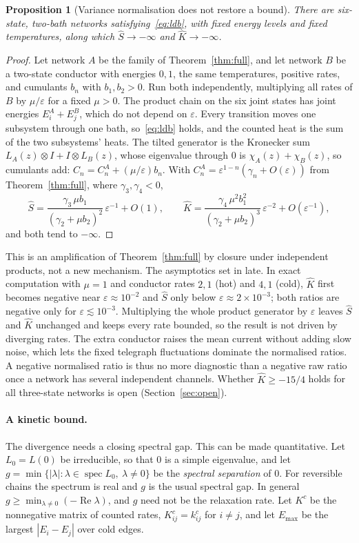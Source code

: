 \documentclass[11pt,a4paper]{article}
\newtheorem{proposition}[theorem]{Proposition}
\theoremstyle{remark}\newtheorem{remark}[theorem]{Remark}
\newcommand{\eps}{\varepsilon}
\begin{document}
\begin{proposition}[Variance normalisation does not restore a bound]\label{prop:product}
There are six-state, two-bath networks satisfying~\eqref{eq:ldb}, with fixed energy levels and fixed temperatures, along which $\hat S\to-\infty$ and $\hat K\to-\infty$.
\end{proposition}
\begin{proof}
Let network $A$ be the family of Theorem~\ref{thm:full}, and let network $B$ be a two-state conductor with energies $0,1$, the same temperatures, positive rates, and cumulants $b_n$ with $b_1,b_2>0$. Run both independently, multiplying all rates of $B$ by $\mu/\eps$ for a fixed $\mu>0$. The product chain on the six joint states has joint energies $E^A_i+E^B_j$, which do not depend on $\eps$. Every transition moves one subsystem through one bath, so~\eqref{eq:ldb} holds, and the counted heat is the sum of the two subsystems' heats. The tilted generator is the Kronecker sum $L_A(z)\otimes I+I\otimes L_B(z)$, whose eigenvalue through $0$ is $\chi_A(z)+\chi_B(z)$, so cumulants add: $C_n=C^A_n+(\mu/\eps)b_n$. With $C^A_n=\eps^{1-n}(\gamma_n+O(\eps))$ from Theorem~\ref{thm:full}, where $\gamma_3,\gamma_4<0$,
\begin{equation}
\hat S=\frac{\gamma_3\,\mu b_1}{(\gamma_2+\mu b_2)^2}\,\eps^{-1}+O(1),\qquad
\hat K=\frac{\gamma_4\,\mu^2b_1^2}{(\gamma_2+\mu b_2)^3}\,\eps^{-2}+O(\eps^{-1}),
\end{equation}
and both tend to $-\infty$.
\end{proof}
This is an amplification of Theorem~\ref{thm:full} by closure under independent products, not a new mechanism. The asymptotics set in late. In exact computation with $\mu=1$ and conductor rates $2,1$ (hot) and $4,1$ (cold), $\hat K$ first becomes negative near $\eps\approx10^{-2}$ and $\hat S$ only below $\eps\approx2\times10^{-3}$; both ratios are negative only for $\eps\lesssim10^{-3}$. Multiplying the whole product generator by $\eps$ leaves $\hat S$ and $\hat K$ unchanged and keeps every rate bounded, so the result is not driven by diverging rates.
The extra conductor raises the mean current without adding slow noise, which lets the fixed telegraph fluctuations dominate the normalised ratios. A negative normalised ratio is thus no more diagnostic than a negative raw ratio once a network has several independent channels. Whether $\hat K\ge-15/4$ holds for all three-state networks is open (Section~\ref{sec:open}).

\paragraph{A kinetic bound.} The divergence needs a closing spectral gap. This can be made quantitative. Let $L_0=L(0)$ be irreducible, so that $0$ is a simple eigenvalue, and let $g=\min\{|\lambda|:\lambda\in\operatorname{spec}L_0,\ \lambda\ne0\}$ be the \emph{spectral separation} of $0$. For reversible chains the spectrum is real and $g$ is the usual spectral gap. In general $g\ge\min_{\lambda\ne0}(-\operatorname{Re}\lambda)$, and $g$ need not be the relaxation rate. Let $K^c$ be the nonnegative matrix of counted rates, $K^c_{ij}=k^c_{ij}$ for $i\ne j$, and let $E_{\max}$ be the largest $|E_i-E_j|$ over cold edges.
\end{document}
